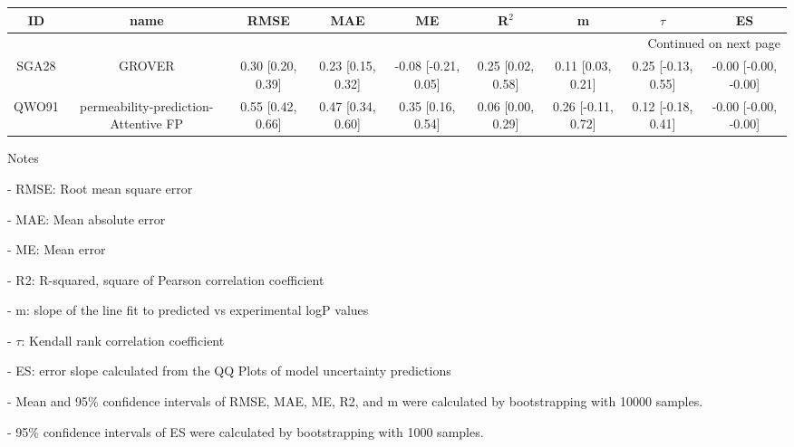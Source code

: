 \documentclass{article}
\begin{document}
\begin{center}
\scriptsize
\begin{longtable}{|ccccccccc|}
\toprule
    ID &                                  name &               RMSE &                MAE &                   ME &              R$^2$ &                   m &              $\tau$ &                    ES \\
\midrule
\endhead
\midrule
\multicolumn{9}{r}{{Continued on next page}} \\
\midrule
\endfoot

\bottomrule
\endlastfoot
 SGA28 &                                GROVER &  0.30 [0.20, 0.39] &  0.23 [0.15, 0.32] &  -0.08 [-0.21, 0.05] &  0.25 [0.02, 0.58] &   0.11 [0.03, 0.21] &  0.25 [-0.13, 0.55] &  -0.00 [-0.00, -0.00] \\
 QWO91 &  permeability-prediction-Attentive FP &  0.55 [0.42, 0.66] &  0.47 [0.34, 0.60] &    0.35 [0.16, 0.54] &  0.06 [0.00, 0.29] &  0.26 [-0.11, 0.72] &  0.12 [-0.18, 0.41] &  -0.00 [-0.00, -0.00] \\
\end{longtable}
\end{center}

Notes

- RMSE: Root mean square error

- MAE: Mean absolute error

- ME: Mean error

- R2: R-squared, square of Pearson correlation coefficient

- m: slope of the line fit to predicted vs experimental logP values

- $\tau$:  Kendall rank correlation coefficient

- ES: error slope calculated from the QQ Plots of model uncertainty predictions

- Mean and 95\% confidence intervals of RMSE, MAE, ME, R2, and m were calculated by bootstrapping with 10000 samples.

- 95\% confidence intervals of ES were calculated by bootstrapping with 1000 samples.\end{document}
\end{document}
